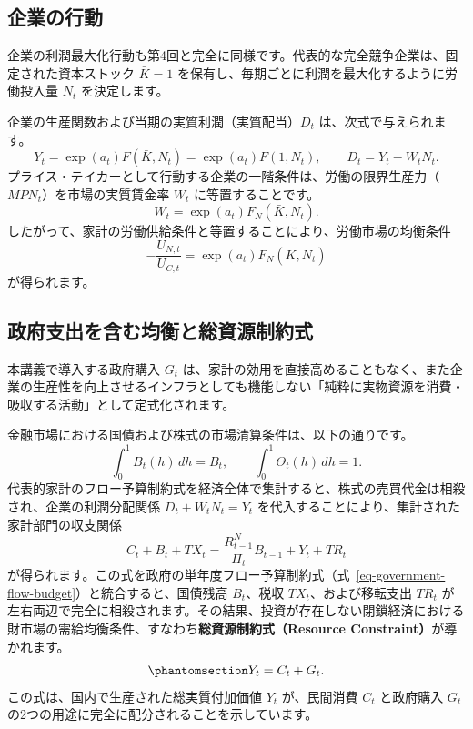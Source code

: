 \documentclass[
  japanese,
  lualatex,
  ja=standard,
  12pt,
  a4paper]{ltjsarticle}
\begin{document}
\subsection{企業の行動}\label{ux4f01ux696dux306eux884cux52d5}

企業の利潤最大化行動も第4回と完全に同様です。代表的な完全競争企業は、固定された資本ストック
\(\bar{K}=1\) を保有し、毎期ごとに利潤を最大化するように労働投入量
\(N_t\) を決定します。

企業の生産関数および当期の実質利潤（実質配当）\(D_t\)
は、次式で与えられます。 \[
Y_t = \exp(a_t) F(\bar{K}, N_t) = \exp(a_t) F(1, N_t), \qquad D_t = Y_t - W_t N_t.
\]
プライス・テイカーとして行動する企業の一階条件は、労働の限界生産力（\(MPN_t\)）を市場の実質賃金率
\(W_t\) に等置することです。 \[
W_t = \exp(a_t) F_N(\bar{K}, N_t).
\]
したがって、家計の労働供給条件と等置することにより、労働市場の均衡条件
\[
-\frac{U_{N,t}}{U_{C,t}} = \exp(a_t) F_N(\bar{K}, N_t)
\] が得られます。

\subsection{政府支出を含む均衡と総資源制約式}\label{ux653fux5e9cux652fux51faux3092ux542bux3080ux5747ux8861ux3068ux7dcfux8cc7ux6e90ux5236ux7d04ux5f0f}

本講義で導入する政府購入 \(G_t\)
は、家計の効用を直接高めることもなく、また企業の生産性を向上させるインフラとしても機能しない「純粋に実物資源を消費・吸収する活動」として定式化されます。

金融市場における国債および株式の市場清算条件は、以下の通りです。 \[
\int_0^1 B_t(h)\,dh = B_t, \qquad \int_0^1 \Theta_t(h)\,dh = 1.
\]
代表的家計のフロー予算制約式を経済全体で集計すると、株式の売買代金は相殺され、企業の利潤分配関係
\(D_t + W_t N_t = Y_t\)
を代入することにより、集計された家計部門の収支関係 \[
C_t + B_t + TX_t = \frac{R_{t-1}^N}{\Pi_t} B_{t-1} + Y_t + TR_t
\]
が得られます。この式を政府の単年度フロー予算制約式（式~\ref{eq-government-flow-budget}）と統合すると、国債残高
\(B_t\)、税収 \(TX_t\)、および移転支出 \(TR_t\)
が左右両辺で完全に相殺されます。その結果、投資が存在しない閉鎖経済における財市場の需給均衡条件、すなわち\textbf{総資源制約式（Resource
Constraint）}が導かれます。
\begin{equation}\protect\phantomsection\label{eq-resource-constraint-government}{
Y_t = C_t + G_t.
}\end{equation} この式は、国内で生産された総実質付加価値 \(Y_t\)
が、民間消費 \(C_t\) と政府購入 \(G_t\)
の2つの用途に完全に配分されることを示しています。
\end{document}
